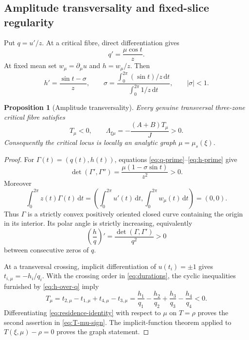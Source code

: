 \documentclass[11pt]{article}
\newtheorem{proposition}[theorem]{Proposition}
\newcommand{\dd}{\,\mathrm d}
\begin{document}
\subsection{Amplitude transversality and fixed-slice regularity}

Put $q=u'/z$.  At a critical fibre, direct differentiation gives
\begin{equation}\label{eq:q-prime}
 q'=\frac{\mu\cos t}{z}.
\end{equation}
At fixed mean set $w_\mu=\partial_\mu u$ and $h=w_\mu/z$.  Then
\begin{equation}\label{eq:h-prime}
 h'=\frac{\sin t-\sigma}{z},
 \qquad
 \sigma=\frac{\int_0^{2\pi}(\sin t)/z\dd t}{\int_0^{2\pi}1/z\dd t},
 \qquad |\sigma|<1.
\end{equation}

\begin{proposition}[Amplitude transversality]\label{prop:amplitude}
Every genuine transversal three-zone critical fibre satisfies
\begin{equation}\label{eq:T-mu-sign}
 T_\mu<0,
 \qquad
 \Lambda_{\xi\mu}=-\frac{(A+B)T_\mu}{J}>0.
\end{equation}
Consequently the critical locus is locally an analytic graph $\mu=\mu_s(\xi)$.
\end{proposition}

\begin{proof}
For $\Gamma(t)=(q(t),h(t))$, equations \eqref{eq:q-prime}--\eqref{eq:h-prime} give
\begin{equation}\label{eq:convexity-determinant}
 \det(\Gamma',\Gamma'')
 =\frac{\mu(1-\sigma\sin t)}{z^2}>0.
\end{equation}
Moreover
\[
 \int_0^{2\pi}z(t)\Gamma(t)\dd t
 =\left(\int_0^{2\pi}u'(t)\dd t,
 \int_0^{2\pi}w_\mu(t)\dd t\right)=(0,0).
\]
Thus $\Gamma$ is a strictly convex positively oriented closed curve containing the origin in its interior.  Its polar angle is strictly increasing, equivalently
\begin{equation}\label{eq:h-over-q}
 \left(\frac hq\right)'=
 \frac{\det(\Gamma,\Gamma')}{q^2}>0
\end{equation}
between consecutive zeros of $q$.

At a transversal crossing, implicit differentiation of $u(t_i)=\pm1$ gives $t_{i,\mu}=-h_i/q_i$.  With the crossing order in \eqref{eq:durations}, the cyclic inequalities furnished by \eqref{eq:h-over-q} imply
\[
 T_\mu=t_{2,\mu}-t_{1,\mu}+t_{4,\mu}-t_{3,\mu}
 =\frac{h_1}{q_1}-\frac{h_2}{q_2}
  +\frac{h_3}{q_3}-\frac{h_4}{q_4}<0.
\]
Differentiating \eqref{eq:residence-identity} with respect to $\mu$ on $T=\rho$ proves the second assertion in \eqref{eq:T-mu-sign}.  The implicit-function theorem applied to $T(\xi,\mu)-\rho=0$ proves the graph statement.
\end{proof}
\end{document}
